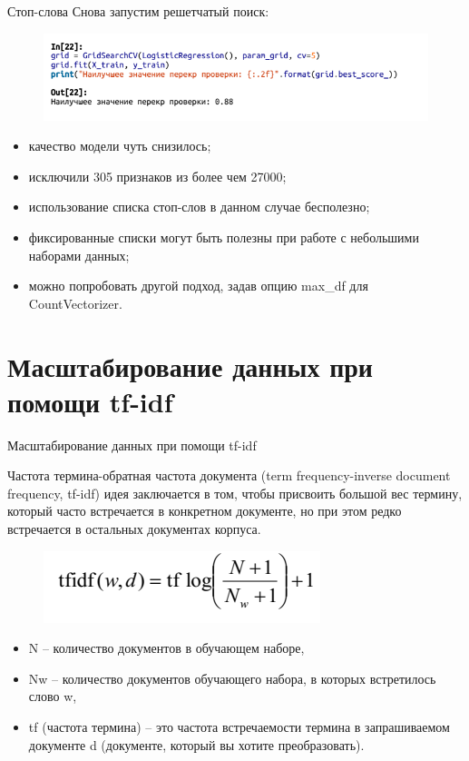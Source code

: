\documentclass{beamer}
\begin{document}
\begin{frame}{Стоп-слова}
Снова запустим решетчатый поиск:
\begin{figure}[h]
\centering
\includegraphics[scale=0.6]{images/lec09-pic21.png}
\end{figure}
\begin{itemize}
\item качество модели чуть снизилось;
\item исключили 305 признаков из более чем 27000;
\item использование списка стоп-слов в данном случае бесполезно;
\item фиксированные списки могут быть полезны при работе с небольшими наборами данных;
\item можно попробовать другой подход, задав опцию max\_df для CountVectorizer.
\end{itemize}
\end{frame}

\section{Масштабирование данных при помощи tf-idf}

\begin{frame}{Масштабирование данных при помощи tf-idf}
\begin{block}{Частота термина-обратная частота документа (term frequency-inverse document frequency, tf-idf)}
идея заключается в том, чтобы присвоить большой вес термину, который часто встречается в конкретном документе, но при этом редко встречается в остальных документах корпуса.
\end{block}
\begin{figure}[h]
\centering
\includegraphics[scale=0.5]{images/lec09-pic22.png}
\end{figure}
\begin{itemize}
\item N – количество документов в обучающем наборе, 
\item Nw – количество документов обучающего набора, в которых встретилось слово w, 
\item tf (частота термина) – это частота встречаемости термина в запрашиваемом документе d (документе, который вы хотите преобразовать).
\end{itemize}
\end{frame}
\end{document}
